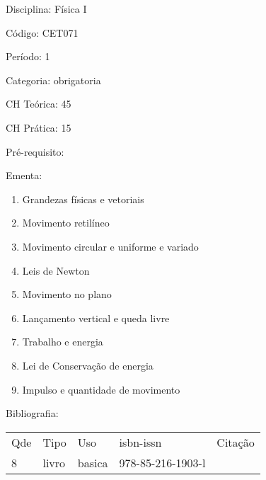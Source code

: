 \documentclass[12pt,a4paper,twoside]{report}
\begin{document}
Disciplina: Física I

Código: CET071

Período: 1

Categoria: obrigatoria

CH Teórica: 45

CH Prática: 15




Pré-requisito:
\begin{enumerate}
\end{enumerate}

Ementa:
\begin{enumerate}
\item Grandezas físicas e vetoriais
\item Movimento retilíneo
\item Movimento circular e uniforme e variado
\item Leis de Newton
\item Movimento no plano
\item Lançamento vertical e queda livre
\item Trabalho e energia
\item Lei de Conservação de energia
\item Impulso e quantidade de movimento
\end{enumerate}



Bibliografia:


\begin{tabular}{llllp{8cm}}
Qde & Tipo & Uso & isbn-issn & Citação \\
8&livro&basica&978-85-216-1903-l&\\
\end{tabular}
\end{document}
